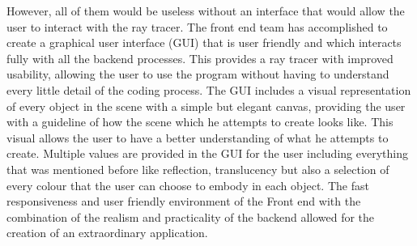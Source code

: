\documentclass[10pt]{scrartcl}
\begin{document}
However, all of them would be useless without an interface that would allow the user to interact with the ray tracer. The front end team has accomplished to create a graphical user interface (GUI) that is user friendly and which interacts fully with all the backend processes. This provides a ray tracer with improved usability, allowing the user to use the program without having to understand every little detail of the coding process. The GUI includes a visual representation of every object in the scene with a simple but elegant canvas, providing the user with a guideline of how the scene which he attempts to create looks like. This visual allows the user to have a better understanding of what he attempts to create. Multiple values are provided in the GUI for the user including everything that was mentioned before like reflection, translucency but also a selection of every colour that the user can choose to embody in each object. The fast responsiveness and user friendly environment of the Front end with the combination of the realism and practicality of the backend allowed for the creation of an extraordinary application.\par
\end{document}
